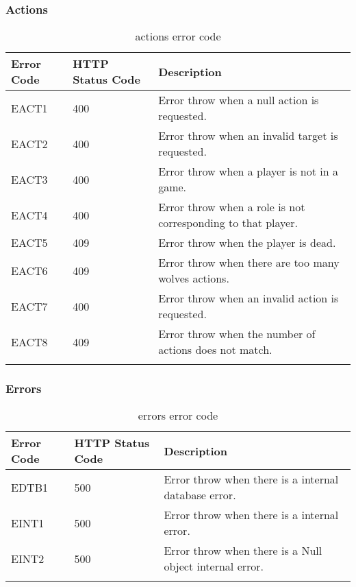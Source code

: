 \subsubsection{Actions}
\begin{longtable}{|p{}|p{} |p{}|}
    \hline
    \textbf{Error Code} & \textbf{HTTP Status Code} & \textbf{Description} \\\hline
    EACT1 & 400 & Error throw when a null action is requested.\\\hline
    EACT2 & 400 & Error throw when an invalid target is requested.\\\hline
    EACT3 & 400 & Error throw when a player is not in a game.\\\hline
    EACT4 & 400 & Error throw when a role is not corresponding to that player.\\\hline
    EACT5 & 409 & Error throw when the player is dead.\\\hline
    EACT6 & 409 & Error throw when there are too many wolves actions.\\\hline
    EACT7 & 400 & Error throw when an invalid action is requested.\\\hline
    EACT8 & 409 & Error throw when the number of actions does not match.\\\hline
    \caption{actions error code}
    \label{tab:actions_error_code}
\end{longtable}
\subsubsection{Errors}
\begin{longtable}{|p{}|p{} |p{}|} 
    \hline
    \textbf{Error Code} & \textbf{HTTP Status Code} & \textbf{Description} \\\hline
    EDTB1 & 500 & Error throw when there is a internal database error.\\\hline
    EINT1 & 500 & Error throw when there is a internal error.\\\hline
    EINT2 & 500 & Error throw when there is a Null object internal error.\\\hline
    \caption{errors error code}
    \label{tab:errors_error_code}
\end{longtable}